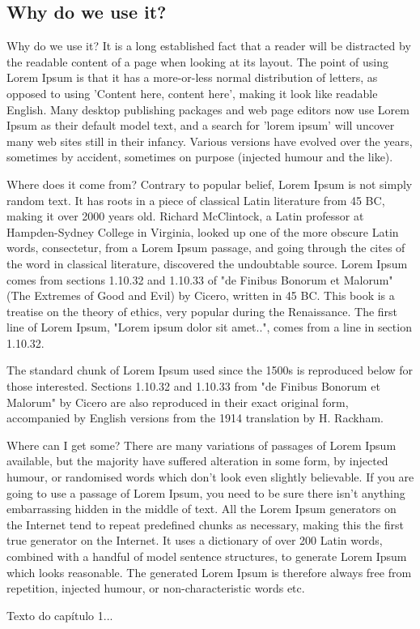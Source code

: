 \documentclass{article}
\begin{document}
\subsection{Why do we use it?}
Why do we use it?
It is a long established fact that a reader will be distracted by the readable content of a page when looking at its layout. The point of using Lorem Ipsum is that it has a more-or-less normal distribution of letters, as opposed to using 'Content here, content here', making it look like readable English. Many desktop publishing packages and web page editors now use Lorem Ipsum as their default model text, and a search for 'lorem ipsum' will uncover many web sites still in their infancy. Various versions have evolved over the years, sometimes by accident, sometimes on purpose (injected humour and the like).

Where does it come from?
Contrary to popular belief, Lorem Ipsum is not simply random text. It has roots in a piece of classical Latin literature from 45 BC, making it over 2000 years old. Richard McClintock, a Latin professor at Hampden-Sydney College in Virginia, looked up one of the more obscure Latin words, consectetur, from a Lorem Ipsum passage, and going through the cites of the word in classical literature, discovered the undoubtable source. Lorem Ipsum comes from sections 1.10.32 and 1.10.33 of "de Finibus Bonorum et Malorum" (The Extremes of Good and Evil) by Cicero, written in 45 BC. This book is a treatise on the theory of ethics, very popular during the Renaissance. The first line of Lorem Ipsum, "Lorem ipsum dolor sit amet..", comes from a line in section 1.10.32.

The standard chunk of Lorem Ipsum used since the 1500s is reproduced below for those interested. Sections 1.10.32 and 1.10.33 from "de Finibus Bonorum et Malorum" by Cicero are also reproduced in their exact original form, accompanied by English versions from the 1914 translation by H. Rackham.

Where can I get some?
There are many variations of passages of Lorem Ipsum available, but the majority have suffered alteration in some form, by injected humour, or randomised words which don't look even slightly believable. If you are going to use a passage of Lorem Ipsum, you need to be sure there isn't anything embarrassing hidden in the middle of text. All the Lorem Ipsum generators on the Internet tend to repeat predefined chunks as necessary, making this the first true generator on the Internet. It uses a dictionary of over 200 Latin words, combined with a handful of model sentence structures, to generate Lorem Ipsum which looks reasonable. The generated Lorem Ipsum is therefore always free from repetition, injected humour, or non-characteristic words etc.

Texto do capítulo 1...
\end{document}
